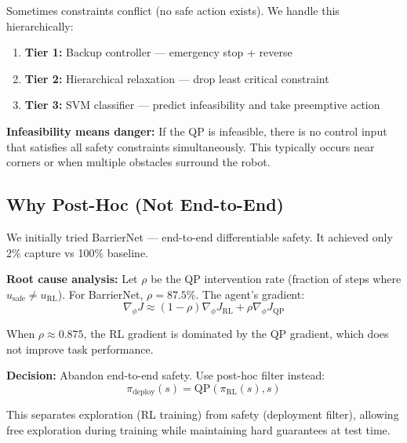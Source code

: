 \documentclass[11pt,a4paper]{report}
\begin{document}
Sometimes constraints conflict (no safe action exists). We handle this hierarchically:
\begin{enumerate}
    \item \textbf{Tier 1:} Backup controller --- emergency stop + reverse
    \item \textbf{Tier 2:} Hierarchical relaxation --- drop least critical constraint
    \item \textbf{Tier 3:} SVM classifier --- predict infeasibility and take preemptive action
\end{enumerate}

\begin{warningbox}
\textbf{Infeasibility means danger:} If the QP is infeasible, there is no control input that satisfies all safety constraints simultaneously. This typically occurs near corners or when multiple obstacles surround the robot.
\end{warningbox}

\subsection{Why Post-Hoc (Not End-to-End)}

We initially tried BarrierNet --- end-to-end differentiable safety. It achieved only 2\% capture vs 100\% baseline.

\textbf{Root cause analysis:} Let $\rho$ be the QP intervention rate (fraction of steps where $u_{\text{safe}} \neq u_{\text{RL}}$). For BarrierNet, $\rho = 87.5\%$. The agent's gradient:
\begin{equation}
    \nabla_\phi J \approx (1-\rho) \nabla_\phi J_{\text{RL}} + \rho \nabla_\phi J_{\text{QP}}
\end{equation}

When $\rho \approx 0.875$, the RL gradient is dominated by the QP gradient, which does not improve task performance.

\begin{decisionbox}
\textbf{Decision:} Abandon end-to-end safety. Use post-hoc filter instead:
\begin{equation}
    \pi_{\text{deploy}}(s) = \text{QP}(\pi_{\text{RL}}(s), s)
\end{equation}

This separates exploration (RL training) from safety (deployment filter), allowing free exploration during training while maintaining hard guarantees at test time.
\end{decisionbox}
\end{document}
